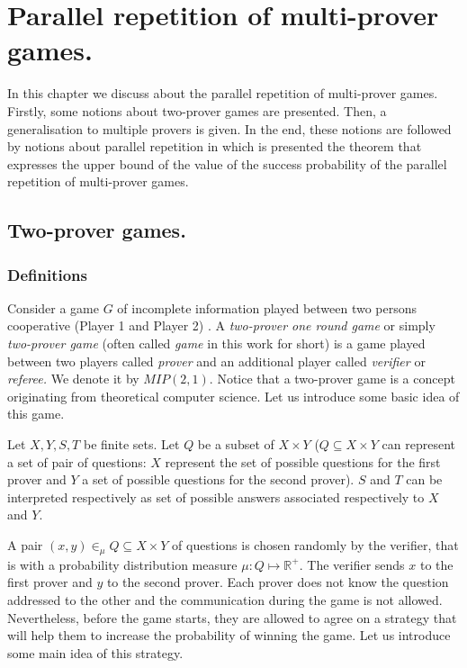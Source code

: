 \chapter{Parallel repetition of multi-prover games.}


In this chapter we discuss about the parallel repetition of multi-prover games. Firstly, some notions about two-prover games are presented. Then, a generalisation to multiple  provers is given. In the end, these notions are followed by notions about parallel repetition in which is presented the theorem that expresses the upper bound of the value of the success probability of the parallel repetition of multi-prover games.


\section{Two-prover games.}


\subsection{Definitions} \label{tpg}

Consider a game $G$  of incomplete information played between two persons cooperative (Player 1 and Player 2)
\citep{verbitsky1996towards, raz2010parallel}. A \textit{two-prover one round  game} or simply \textit{two-prover game} (often called \textit{game} in this work for short) is a game played between two players called \textit{prover} and an additional player called \textit{verifier} or \textit{referee.}
We denote it by $MIP(2,1)$.
Notice that a two-prover game is a concept originating from theoretical computer science. Let us introduce some basic idea of this game.

Let $X, Y, S, T$ be  finite sets. Let $Q$ be a subset of $X\times Y$ ($Q \subseteq X \times Y$ can represent a set of pair of questions: $X$ represent the set of possible questions for the first prover and $Y$ a set of possible questions for the second prover).    $S$ and $T$ can be interpreted respectively as set of possible answers associated respectively to $X$ and $Y$.

A pair $(x,y) \in_{\mu} Q \subseteq X\times Y$ of questions is chosen randomly  by the verifier, that is with a probability distribution measure $\mu: Q \longmapsto \mathbb{R}^+.$
The verifier sends $x$ to the first prover and $y$ to the second prover. Each prover does not know the question addressed to the other and the communication during the game is not allowed. Nevertheless, before the game starts, they are allowed to agree on a strategy that will help them to increase the probability of winning the game. Let us introduce some main idea of this strategy. 

